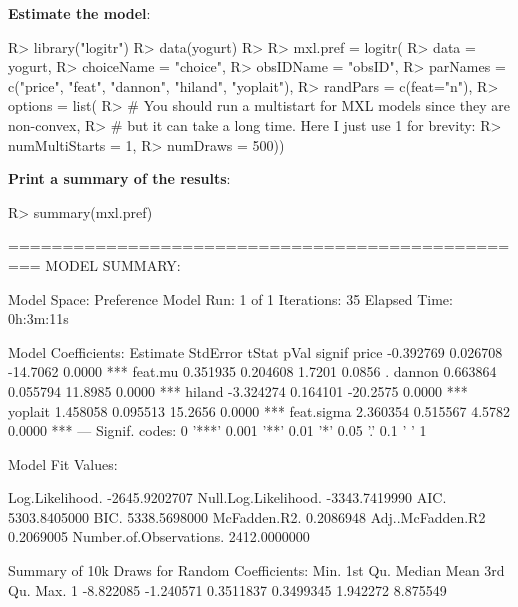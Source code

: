 \documentclass[article]{jss}
\begin{document}
\textbf{Estimate the model}:

\begin{CodeChunk}

\begin{CodeInput}
R> library("logitr")
R> data(yogurt)
R> 
R> mxl.pref = logitr(
R>     data       = yogurt,
R>     choiceName = "choice",
R>     obsIDName  = "obsID",
R>     parNames   = c("price", "feat", "dannon", "hiland", "yoplait"),
R>     randPars   = c(feat="n"),
R>     options    = list(
R>     # You should run a multistart for MXL models since they are non-convex,
R>     # but it can take a long time. Here I just use 1 for brevity:
R>         numMultiStarts = 1,
R>         numDraws       = 500))
\end{CodeInput}
\end{CodeChunk}

\textbf{Print a summary of the results}:

\begin{CodeChunk}

\begin{CodeInput}
R> summary(mxl.pref)
\end{CodeInput}

\begin{CodeOutput}
=================================================
MODEL SUMMARY: 
                        
Model Space:  Preference
Model Run:        1 of 1
Iterations:           35
Elapsed Time:  0h:3m:11s

Model Coefficients: 
            Estimate StdError    tStat   pVal signif
price      -0.392769 0.026708 -14.7062 0.0000    ***
feat.mu     0.351935 0.204608   1.7201 0.0856      .
dannon      0.663864 0.055794  11.8985 0.0000    ***
hiland     -3.324274 0.164101 -20.2575 0.0000    ***
yoplait     1.458058 0.095513  15.2656 0.0000    ***
feat.sigma  2.360354 0.515567   4.5782 0.0000    ***
---
Signif. codes:  0 '***' 0.001 '**' 0.01 '*' 0.05 '.' 0.1 ' ' 1

Model Fit Values: 
                                     
Log.Likelihood.         -2645.9202707
Null.Log.Likelihood.    -3343.7419990
AIC.                     5303.8405000
BIC.                     5338.5698000
McFadden.R2.                0.2086948
Adj..McFadden.R2            0.2069005
Number.of.Observations.  2412.0000000

Summary of 10k Draws for Random Coefficients: 
       Min.   1st Qu.    Median      Mean  3rd Qu.     Max.
1 -8.822085 -1.240571 0.3511837 0.3499345 1.942272 8.875549
\end{CodeOutput}
\end{CodeChunk}
\end{document}
